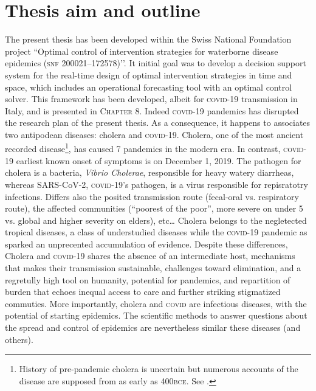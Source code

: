 \section{Thesis aim and outline} 
The present thesis has been developed within the Swiss National Foundation project ``Optimal control of intervention strategies for waterborne disease epidemics (\textsc{snf} 200021–172578)’’. It initial goal was to develop a decision support system for the real-time design of optimal intervention strategies in time and space, which includes an operational forecasting tool with an optimal control solver. This framework has been developed, albeit for \textsc{covid}-19 transmission in Italy, and is presented in \textsc{Chapter 8}. Indeed \textsc{covid}-19 pandemics has disrupted the research plan of the present thesis. As a consequence, it happens to associates two antipodean diseases: cholera and \textsc{covid}-19. Cholera, one of the most ancient recorded disease\footnote[][10\baselineskip]{History of pre-pandemic cholera is uncertain but numerous accounts of the disease are supposed from as early as 400\textsc{bce}. See .}, has caused 7 pandemics in the modern era. In contrast, \textsc{covid}-19 earliest known onset of symptoms is on December 1, 2019. The pathogen for cholera is a bacteria, \textit{Vibrio Cholerae}, responsible for heavy watery diarrheas, whereas SARS-CoV-2, \textsc{covid}-19’s pathogen, is a virus responsible for repisratotry infections. Differs also the posited transmission route (fecal-oral vs. respiratory route), the affected communities (``poorest of the poor”, more severe on under 5 vs. global and higher severity on elders), etc… Cholera belongs to the negletected tropical diseases, a class of understudied diseases while the \textsc{covid}-19 pandemic as sparked an unprecented accumulation of evidence\cite{COVID-19OpenAccessProject:LivingEvidenceCOVID19:2020}. Despite these differences, Cholera and \textsc{covid}-19 shares the absence of an intermediate host, mechanisms that makes their transmission sustainable, challenges toward elimination, and a regretully high tool on humanity, potential for pandemics, and repartition of burden that echoes inequal access to care and further striking stigmatized commuties. More importantly, cholera and \textsc{covid} are infectious diseases, with the potential of starting epidemics. The scientific methods to answer questions about the spread and control of epidemics are nevertheless similar these diseases (and others).


